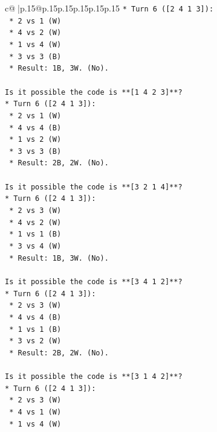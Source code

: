 \documentclass{article}
\begin{document}
{\begin{supertabular}{c@{$\;$}|p{.15\linewidth}@{}p{.15\linewidth}p{.15\linewidth}p{.15\linewidth}p{.15\linewidth}p{.15\linewidth}}
{{{\texttt{*   Turn 6 ({[}2 4 1 3{]}):} \\
\texttt{    *   2 vs 1 (W)} \\
\texttt{    *   4 vs 2 (W)} \\
\texttt{    *   1 vs 4 (W)} \\
\texttt{    *   3 vs 3 (B)} \\
\texttt{    *   Result: 1B, 3W. (No).} \\
\\ 
\texttt{Is it possible the code is **{[}1 4 2 3{]}**?} \\
\texttt{*   Turn 6 ({[}2 4 1 3{]}):} \\
\texttt{    *   2 vs 1 (W)} \\
\texttt{    *   4 vs 4 (B)} \\
\texttt{    *   1 vs 2 (W)} \\
\texttt{    *   3 vs 3 (B)} \\
\texttt{    *   Result: 2B, 2W. (No).} \\
\\ 
\texttt{Is it possible the code is **{[}3 2 1 4{]}**?} \\
\texttt{*   Turn 6 ({[}2 4 1 3{]}):} \\
\texttt{    *   2 vs 3 (W)} \\
\texttt{    *   4 vs 2 (W)} \\
\texttt{    *   1 vs 1 (B)} \\
\texttt{    *   3 vs 4 (W)} \\
\texttt{    *   Result: 1B, 3W. (No).} \\
\\ 
\texttt{Is it possible the code is **{[}3 4 1 2{]}**?} \\
\texttt{*   Turn 6 ({[}2 4 1 3{]}):} \\
\texttt{    *   2 vs 3 (W)} \\
\texttt{    *   4 vs 4 (B)} \\
\texttt{    *   1 vs 1 (B)} \\
\texttt{    *   3 vs 2 (W)} \\
\texttt{    *   Result: 2B, 2W. (No).} \\
\\ 
\texttt{Is it possible the code is **{[}3 1 4 2{]}**?} \\
\texttt{*   Turn 6 ({[}2 4 1 3{]}):} \\
\texttt{    *   2 vs 3 (W)} \\
\texttt{    *   4 vs 1 (W)} \\
\texttt{    *   1 vs 4 (W)} \\
}}}
\end{supertabular}}
\end{document}
